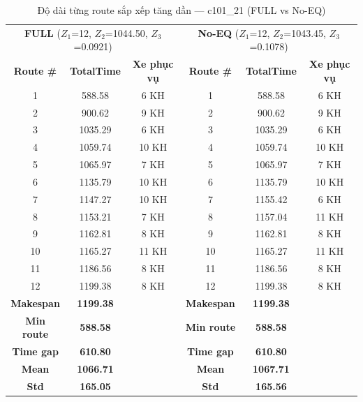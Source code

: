 \documentclass[12pt,a4paper]{article}
\begin{document}
\begin{table}[H]
    \centering
    \caption{Độ dài từng route sắp xếp tăng dần --- c101\_21 (FULL vs No-EQ)}
    \label{tab:route_lengths}
    \small
    \begin{tabular}{ccc|ccc}
        \toprule
        \multicolumn{3}{c|}{\textbf{FULL} ($Z_1$=12, $Z_2$=1044.50, $Z_3$=0.0921)} &
        \multicolumn{3}{c}{\textbf{No-EQ} ($Z_1$=12, $Z_2$=1043.45, $Z_3$=0.1078)} \\
        \textbf{Route \#} & \textbf{TotalTime} & \textbf{Xe phục vụ} &
        \textbf{Route \#} & \textbf{TotalTime} & \textbf{Xe phục vụ} \\
        \midrule
        1  & 588.58  & 6 KH  & 1  & 588.58  & 6 KH \\
        2  & 900.62  & 9 KH  & 2  & 900.62  & 9 KH \\
        3  & 1035.29 & 6 KH  & 3  & 1035.29 & 6 KH \\
        4  & 1059.74 & 10 KH & 4  & 1059.74 & 10 KH \\
        5  & 1065.97 & 7 KH  & 5  & 1065.97 & 7 KH \\
        6  & 1135.79 & 10 KH & 6  & 1135.79 & 10 KH \\
        7  & 1147.27 & 10 KH & 7  & 1155.42 & 6 KH \\
        8  & 1153.21 & 7 KH  & 8  & 1157.04 & 11 KH \\
        9  & 1162.81 & 8 KH  & 9  & 1162.81 & 8 KH \\
        10 & 1165.27 & 11 KH & 10 & 1165.27 & 11 KH \\
        11 & 1186.56 & 8 KH  & 11 & 1186.56 & 8 KH \\
        12 & 1199.38 & 8 KH  & 12 & 1199.38 & 8 KH \\
        \midrule
        \textbf{Makespan} & \textbf{1199.38} & & \textbf{Makespan} & \textbf{1199.38} & \\
        \textbf{Min route} & \textbf{588.58}  & & \textbf{Min route} & \textbf{588.58}  & \\
        \textbf{Time gap}  & \textbf{610.80}  & & \textbf{Time gap}  & \textbf{610.80}  & \\
        \textbf{Mean}      & \textbf{1066.71} & & \textbf{Mean}      & \textbf{1067.71} & \\
        \textbf{Std}       & \textbf{165.05}  & & \textbf{Std}       & \textbf{165.56}  & \\
        \bottomrule
    \end{tabular}
\end{table}
\end{document}
